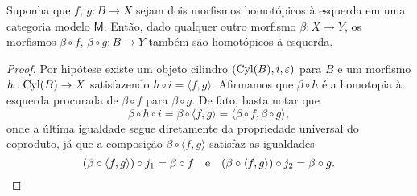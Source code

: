 \begin{prop}\label{prop:composicao_a_esquerda_preserva_homotopia_a_esquerda}
  Suponha que $f,\,g : B \to X$ sejam dois morfismos homotópicos à esquerda em uma categoria modelo $\mathsf{M}$.
  Então, dado qualquer outro morfismo $\beta: X \to Y$, os morfismos $\beta \circ f,\, \beta \circ g: B \to Y$ também são homotópicos à esquerda.
\end{prop}

\begin{proof}
  Por hipótese existe um objeto cilindro $(\mathrm{Cyl}(B),i,\varepsilon)$ para $B$ e um morfismo $h: \mathrm{Cyl}(B) \to X$ satisfazendo $h \circ i = \langle f,g \rangle$.
  Afirmamos que $\beta \circ h$ é a homotopia à esquerda procurada de $\beta \circ f$ para $\beta \circ g$.
  De fato, basta notar que
  \begin{displaymath}
    \beta \circ h \circ i = \beta \circ \langle f,g \rangle = \langle \beta \circ f, \beta \circ g \rangle,
  \end{displaymath}
  onde a última igualdade segue diretamente da propriedade universal do coproduto, já que a composição $\beta \circ \langle f,g \rangle$ satisfaz as igualdades
  \begin{displaymath}
    (\beta \circ \langle f,g \rangle) \circ j_{1} = \beta \circ f \quad \text{e} \quad (\beta \circ \langle f,g \rangle) \circ j_{2} = \beta \circ g. \qedhere
  \end{displaymath}
\end{proof}

